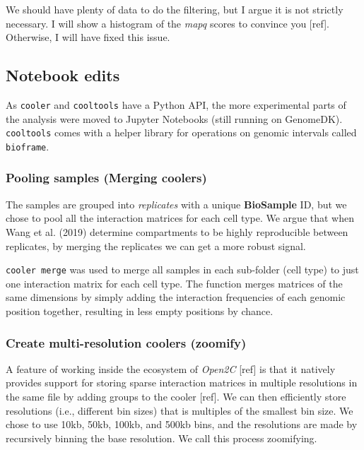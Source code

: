 \documentclass[
  a4paper,
]{scrbook}
\let\oldemph\emph
\renewcommand\emph[1]{\oldemph{\color{gray}#1}}
\begin{document}
We should have plenty of data to do the filtering, but I argue it is not
strictly necessary. I will show a histogram of the \emph{mapq} scores to
convince you {[}ref{]}. Otherwise, I will have fixed this issue.

\subsection{Notebook edits}\label{notebook-edits}

As \texttt{cooler} and \texttt{cooltools} have a Python API, the more
experimental parts of the analysis were moved to Jupyter Notebooks
(still running on GenomeDK). \texttt{cooltools} comes with a helper
library for operations on genomic intervals called \texttt{bioframe}.

\subsubsection{Pooling samples (Merging
coolers)}\label{pooling-samples-merging-coolers}

The samples are grouped into \emph{replicates} with a unique
\textbf{BioSample} ID, but we chose to pool all the interaction matrices
for each cell type. We argue that when Wang et al. (2019) determine
compartments to be highly reproducible between replicates, by merging
the replicates we can get a more robust signal.

\texttt{cooler\ merge} was used to merge all samples in each sub-folder
(cell type) to just one interaction matrix for each cell type. The
function merges matrices of the same dimensions by simply adding the
interaction frequencies of each genomic position together, resulting in
less empty positions by chance.

\subsubsection{Create multi-resolution coolers
(zoomify)}\label{create-multi-resolution-coolers-zoomify}

A feature of working inside the ecosystem of \emph{Open2C} {[}ref{]} is
that it natively provides support for storing sparse interaction
matrices in multiple resolutions in the same file by adding groups to
the cooler {[}ref{]}. We can then efficiently store resolutions (i.e.,
different bin sizes) that is multiples of the smallest bin size. We
chose to use 10kb, 50kb, 100kb, and 500kb bins, and the resolutions are
made by recursively binning the base resolution. We call this process
zoomifying.
\end{document}

